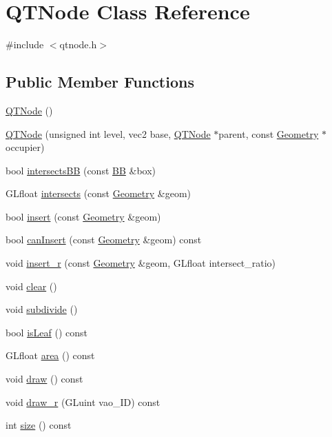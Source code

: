 \hypertarget{class_q_t_node}{\section{Q\+T\+Node Class Reference}
\label{class_q_t_node}
}


{\ttfamily \#include $<$qtnode.\+h$>$}

\subsection*{Public Member Functions}
\begin{DoxyCompactItemize}
\item 
\hyperlink{class_q_t_node_a601b71639f18e093e90517765c817eed}{Q\+T\+Node} ()
\item 
\hyperlink{class_q_t_node_a9052ae467de820a39e60ceea901773ad}{Q\+T\+Node} (unsigned int level, vec2 base, \hyperlink{class_q_t_node}{Q\+T\+Node} $\ast$parent, const \hyperlink{class_geometry}{Geometry} $\ast$occupier)
\item 
bool \hyperlink{class_q_t_node_aa2e853646688313ea09cd42c972ac604}{intersects\+B\+B} (const \hyperlink{class_b_b}{B\+B} \&box)
\item 
G\+Lfloat \hyperlink{class_q_t_node_acfb1c9a19010de38b302a6fb3bd78e5d}{intersects} (const \hyperlink{class_geometry}{Geometry} \&geom)
\item 
bool \hyperlink{class_q_t_node_a202f7f3dea37652fa789dd2d1e3936ff}{insert} (const \hyperlink{class_geometry}{Geometry} \&geom)
\item 
bool \hyperlink{class_q_t_node_a5ade3c5bbd83b900be2a3eae3606a557}{can\+Insert} (const \hyperlink{class_geometry}{Geometry} \&geom) const 
\item 
void \hyperlink{class_q_t_node_ad245f02b3c924534f8d79aafbd195c60}{insert\+\_\+r} (const \hyperlink{class_geometry}{Geometry} \&geom, G\+Lfloat intersect\+\_\+ratio)
\item 
void \hyperlink{class_q_t_node_ab570871d686ec0259441ae53969214cb}{clear} ()
\item 
void \hyperlink{class_q_t_node_aa2407622dcf020ec462853f0733c5ecc}{subdivide} ()
\item 
bool \hyperlink{class_q_t_node_ad7d5ff814ecec37be03263c2a087bfa5}{is\+Leaf} () const 
\item 
G\+Lfloat \hyperlink{class_q_t_node_a22a781e0c628a924db2e55cf3cedf7f9}{area} () const 
\item 
void \hyperlink{class_q_t_node_a40d374c445bbb92e76067c783f591ce5}{draw} () const 
\item 
void \hyperlink{class_q_t_node_a92b79357dfde8058bfe895691916f98d}{draw\+\_\+r} (G\+Luint vao\+\_\+\+I\+D) const 
\item 
int \hyperlink{class_q_t_node_af0c11fa1f7678c48cf0c2a3a3bb349b5}{size} () const 
\end{DoxyCompactItemize}
